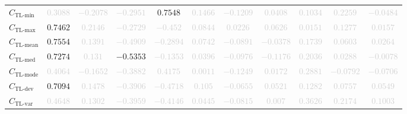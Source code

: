 \documentclass{standalone}
\newcommand{\tlminname}{\text{TL-min}}
\newcommand{\tlmin}{C_{\tlminname}}
\newcommand{\tlavgname}{\text{TL-mean}}
\newcommand{\tlavg}{C_{\tlavgname}}
\newcommand{\tlmaxname}{\text{TL-max}}
\newcommand{\tlmax}{C_{\tlmaxname}}
\newcommand{\tlmedname}{\text{TL-med}}
\newcommand{\tlmed}{C_{\tlmedname}}
\newcommand{\tlmodename}{\text{TL-mode}}
\newcommand{\tlmode}{C_{\tlmodename}}
\newcommand{\tldevname}{\text{TL-dev}}
\newcommand{\tldev}{C_{\tldevname}}
\newcommand{\tlvarname}{\text{TL-var}}
\newcommand{\tlvar}{C_{\tlvarname}}
\begin{document}
\begin{tabular}{lcccccccccc}
$\tlmin$ & \textcolor{lightgray}{$0.3088$} & \textcolor{lightgray}{$-0.2078$} & \textcolor{lightgray}{$-0.2951$} & $0.7548$ & \textcolor{lightgray}{$0.1466$} & \textcolor{lightgray}{$-0.1209$} & \textcolor{lightgray}{$0.0408$} & \textcolor{lightgray}{$0.1034$} & \textcolor{lightgray}{$0.2259$} & \textcolor{lightgray}{$-0.0484$} \\ 
$\tlmax$ & $0.7462$ & \textcolor{lightgray}{$0.2146$} & \textcolor{lightgray}{$-0.2729$} & \textcolor{lightgray}{$-0.452$} & \textcolor{lightgray}{$0.0844$} & \textcolor{lightgray}{$0.0226$} & \textcolor{lightgray}{$0.0626$} & \textcolor{lightgray}{$0.0151$} & \textcolor{lightgray}{$0.1277$} & \textcolor{lightgray}{$0.0157$} \\ 
$\tlavg$ & $0.7554$ & \textcolor{lightgray}{$0.1391$} & \textcolor{lightgray}{$-0.4909$} & \textcolor{lightgray}{$-0.2894$} & \textcolor{lightgray}{$0.0742$} & \textcolor{lightgray}{$-0.0891$} & \textcolor{lightgray}{$-0.0378$} & \textcolor{lightgray}{$0.1739$} & \textcolor{lightgray}{$0.0603$} & \textcolor{lightgray}{$0.0264$} \\ 
$\tlmed$ & $0.7274$ & \textcolor{lightgray}{$0.131$} & $-0.5353$ & \textcolor{lightgray}{$-0.1353$} & \textcolor{lightgray}{$0.0396$} & \textcolor{lightgray}{$-0.0976$} & \textcolor{lightgray}{$-0.1176$} & \textcolor{lightgray}{$0.2036$} & \textcolor{lightgray}{$0.0288$} & \textcolor{lightgray}{$-0.0078$} \\ 
$\tlmode$ & \textcolor{lightgray}{$0.4064$} & \textcolor{lightgray}{$-0.1652$} & \textcolor{lightgray}{$-0.3882$} & \textcolor{lightgray}{$0.4175$} & \textcolor{lightgray}{$0.0011$} & \textcolor{lightgray}{$-0.1249$} & \textcolor{lightgray}{$0.0172$} & \textcolor{lightgray}{$0.2881$} & \textcolor{lightgray}{$-0.0792$} & \textcolor{lightgray}{$-0.0706$} \\ 
$\tldev$ & $0.7094$ & \textcolor{lightgray}{$0.1478$} & \textcolor{lightgray}{$-0.3906$} & \textcolor{lightgray}{$-0.4718$} & \textcolor{lightgray}{$0.105$} & \textcolor{lightgray}{$-0.0655$} & \textcolor{lightgray}{$0.0521$} & \textcolor{lightgray}{$0.1282$} & \textcolor{lightgray}{$0.0757$} & \textcolor{lightgray}{$0.0549$} \\ 
$\tlvar$ & \textcolor{lightgray}{$0.4648$} & \textcolor{lightgray}{$0.1302$} & \textcolor{lightgray}{$-0.3959$} & \textcolor{lightgray}{$-0.4146$} & \textcolor{lightgray}{$0.0445$} & \textcolor{lightgray}{$-0.0815$} & \textcolor{lightgray}{$0.007$} & \textcolor{lightgray}{$0.3626$} & \textcolor{lightgray}{$0.2174$} & \textcolor{lightgray}{$0.1003$} \\ 

\end{tabular}
\end{document}
